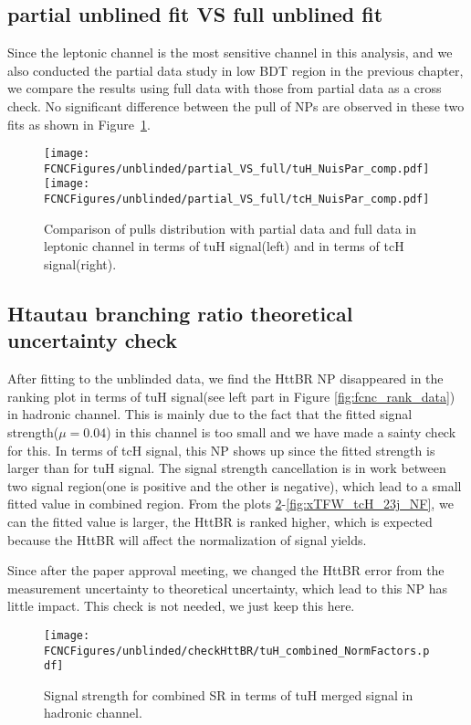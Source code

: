 \subsection{partial unblined fit VS full unblined fit}
Since the leptonic channel is the most sensitive channel in this analysis, and we also conducted the partial data study in low BDT region in the previous chapter, we compare the results using full data with those from partial data as a cross check.
No significant difference between the pull of NPs are observed in these two fits as shown in Figure~\ref{fig:tthML_partialVSfull}.

\begin{figure}[H]
\centering
\texttt{[image: \\FCNCFigures/unblinded/partial\_VS\_full/tuH\_NuisPar\_comp.pdf]}
\texttt{[image: \\FCNCFigures/unblinded/partial\_VS\_full/tcH\_NuisPar\_comp.pdf]}
\\
\caption{Comparison of pulls distribution with partial data and full data in leptonic channel in terms of tuH signal(left) and in terms of tcH signal(right).}
\label{fig:tthML_partialVSfull}
\end{figure}

\subsection{Htautau branching ratio theoretical uncertainty check}
After fitting to the unblinded data, we find the HttBR NP disappeared in the ranking plot in terms of tuH signal(see left part in Figure \ref{fig:fcnc_rank_data}) in hadronic channel. This is mainly due to the fact that the fitted signal strength($\mu=0.04$) in this channel is too small and we have made a sainty check for this. In terms of tcH signal, this NP shows up since the fitted strength is larger than for tuH signal. The signal strength cancellation is in work between two signal region(one is positive and the other is negative), which lead to a small fitted value in combined region. From the plots \ref{fig:xTFW_tuH_NF}-\ref{fig:xTFW_tcH_23j_NF}, we can the fitted value is larger, the HttBR is ranked higher, which is expected because the HttBR will affect the normalization of signal yields.

Since after the paper approval meeting, we changed the HttBR error from the measurement uncertainty to theoretical uncertainty, which lead to this NP has little impact. This check is not needed, we just keep this here.


\begin{figure}[H]
\centering
\texttt{[image: \\FCNCFigures/unblinded/checkHttBR/tuH\_combined\_NormFactors.pdf]}
\\
\caption{Signal strength for combined SR in terms of tuH merged signal in hadronic channel.}
\label{fig:xTFW_tuH_NF}
\end{figure}



